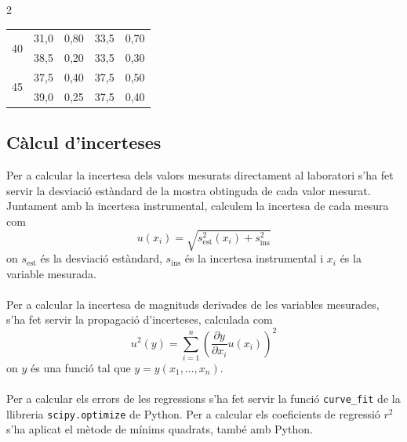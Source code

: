 \documentclass[12pt,twosides,onecolumn,openany]{article}
\newenvironment{Figura}
  {\par\medskip\noindent\minipage{\linewidth}}
  {\endminipage\par\medskip}
\begin{document}
\begin{multicols}{2}
\begin{Figura}
{\begin{tabular}{c|c|c|c|c}
    \multirow{2}{*}{40} & 31,0 & 0,80 & 33,5 & 0,70\\[-0.1cm]
                        & 38,5 & 0,20 & 33,5 & 0,30\\[0.3cm]
    \multirow{2}{*}{45} & 37,5 & 0,40 & 37,5 & 0,50\\[-0.1cm]
                        & 39,0 & 0,25 & 37,5 & 0,40\\[0.3cm]
  \end{tabular}
  }
  \label{tau:comparacio_saturacio}
\end{Figura}
\renewcommand{\arraystretch}{1}
\subsection{Càlcul d'incerteses}
Per a calcular la incertesa dels valors mesurats directament al laboratori s'ha fet servir la desviació estàndard de la mostra obtinguda de cada valor mesurat. Juntament amb la incertesa instrumental, calculem la incertesa de cada mesura com
\begin{equation*}
    u(x_i) = \sqrt{ s_{\text{est}}^2(x_i) + s_{\text{ins}}^2}
\end{equation*}
on $s_{\text{est}}$ és la desviació estàndard, $s_{\text{ins}}$ és la incertesa instrumental i $x_i$ és la variable mesurada.\\\\
Per a calcular la incertesa de magnituds derivades de les variables mesurades, s'ha fet servir la propagació d'incerteses, calculada com
\begin{equation*}
    u^2(y) = \sum_{i = 1}^{n} \left( \frac{\partial y}{\partial{x_i}} u(x_i)\right)^2
\end{equation*}
on $y$ és una funció tal que $y = y(x_1,...,x_n)$.\\\\
Per a calcular els errors de les regressions s'ha fet servir la funció \texttt{curve\_fit} de la llibreria \texttt{scipy.optimize} de Python. Per a calcular els coeficients de regressió $r^2$ s'ha aplicat el mètode de mínims quadrats, també amb Python.
\end{multicols}
 

\end{document}
